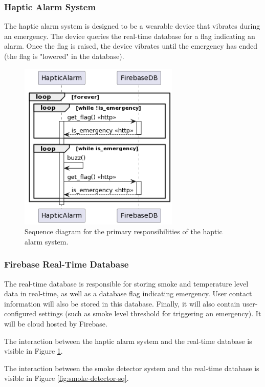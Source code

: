 \subsubsection{Haptic Alarm System}

The haptic alarm system is designed to be a wearable device that vibrates during an emergency. The device queries the
real-time database for a flag indicating an alarm. Once the flag is raised, the device vibrates until the emergency has
ended (the flag is "lowered" in the database).

\begin{figure}[H]
    \centering
    \includegraphics[width=3in]{../assets/HapticAlarmSequence.png}
    \caption{Sequence diagram for the primary responsibilities of the haptic alarm system.}
    \label{fig:haptic-alarm-sq}
\end{figure}

\subsubsection{Firebase Real-Time Database}

The real-time database is responsible for storing smoke and temperature level data in real-time, as well as a database
flag indicating emergency. User contact information will also be stored in this database. Finally, it will also contain
user-configured settings (such as smoke level threshold for triggering an emergency). It will be cloud hosted by
Firebase.

The interaction between the haptic alarm system and the real-time database is visible in Figure
\ref{fig:haptic-alarm-sq}.

The interaction between the smoke detector system and the real-time database is visible in Figure
\ref{fig:smoke-detector-sq}.

